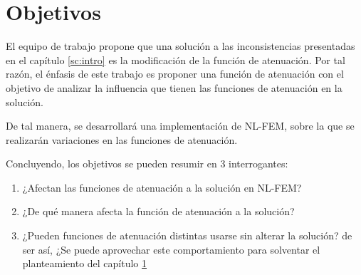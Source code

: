 \begin{comment}

\end{comment}

\section{Objetivos}
\label{sc:objetivos}

El equipo de trabajo propone que una solución a las inconsistencias presentadas en el capítulo \ref{sc:intro} es la modificación de la función de atenuación. Por tal razón, el énfasis de este trabajo es proponer una función de atenuación con el objetivo de analizar la influencia que tienen las funciones de atenuación en la solución.

De tal manera, se desarrollará una implementación de NL-FEM, sobre la que se realizarán variaciones en las funciones de atenuación. 

Concluyendo, los objetivos se pueden resumir en 3 interrogantes:
\begin{enumerate}
	\item ¿Afectan las funciones de atenuación a la solución en NL-FEM?
	\item ¿De qué manera afecta la función de atenuación a la solución?
	\item ¿Pueden funciones de atenuación distintas usarse sin alterar la solución? de ser así, ¿Se puede aprovechar este comportamiento para solventar el planteamiento del capítulo \ref{sc:objetivos}
\end{enumerate}
